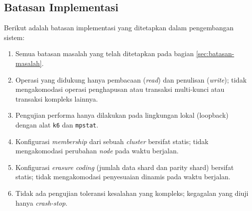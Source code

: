 \subsection{Batasan Implementasi}
\label{subsection:batasan-implementasi}

Berikut adalah batasan implementasi yang ditetapkan dalam pengembangan sistem:
\begin{enumerate}
  \item Semua batasan masalah yang telah ditetapkan pada bagian \ref{sec:batasan-masalah}.
  \item Operasi yang didukung hanya pembacaan (\textit{read}) dan penulisan (\textit{write}); tidak mengakomodasi operasi penghapusan atau transaksi multi-kunci atau transaksi kompleks lainnya.
  \item Pengujian performa hanya dilakukan pada lingkungan lokal (loopback) dengan alat \texttt{k6} dan \texttt{mpstat}.
  \item Konfigurasi \textit{membership} dari sebuah \textit{cluster} bersifat statis; tidak mengakomodasi perubahan \textit{node} pada waktu berjalan.
  \item Konfigurasi \textit{erasure coding} (jumlah data shard dan parity shard) bersifat statis; tidak mengakomodasi penyesuaian dinamis pada waktu berjalan.
  \item Tidak ada pengujian toleransi kesalahan yang kompleks; kegagalan yang diuji hanya \textit{crash-stop}.
\end{enumerate}

